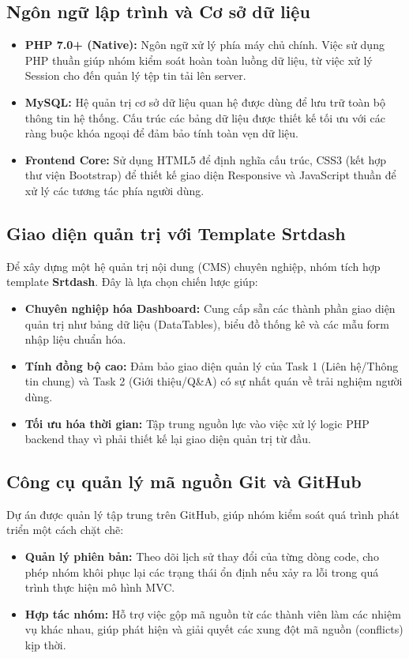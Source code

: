 \subsection{Ngôn ngữ lập trình và Cơ sở dữ liệu}
\begin{itemize}
    \item \textbf{PHP 7.0+ (Native):} Ngôn ngữ xử lý phía máy chủ chính. Việc sử dụng PHP thuần giúp nhóm kiểm soát hoàn toàn luồng dữ liệu, từ việc xử lý Session cho đến quản lý tệp tin tải lên server.
    \item \textbf{MySQL:} Hệ quản trị cơ sở dữ liệu quan hệ được dùng để lưu trữ toàn bộ thông tin hệ thống. Cấu trúc các bảng dữ liệu được thiết kế tối ưu với các ràng buộc khóa ngoại để đảm bảo tính toàn vẹn dữ liệu.
    \item \textbf{Frontend Core:} Sử dụng HTML5 để định nghĩa cấu trúc, CSS3 (kết hợp thư viện Bootstrap) để thiết kế giao diện Responsive và JavaScript thuần để xử lý các tương tác phía người dùng.
\end{itemize}

\subsection{Giao diện quản trị với Template Srtdash}
Để xây dựng một hệ quản trị nội dung (CMS) chuyên nghiệp, nhóm tích hợp template \textbf{Srtdash}. Đây là lựa chọn chiến lược giúp:
\begin{itemize}
    \item \textbf{Chuyên nghiệp hóa Dashboard:} Cung cấp sẵn các thành phần giao diện quản trị như bảng dữ liệu (DataTables), biểu đồ thống kê và các mẫu form nhập liệu chuẩn hóa.
    \item \textbf{Tính đồng bộ cao:} Đảm bảo giao diện quản lý của Task 1 (Liên hệ/Thông tin chung) và Task 2 (Giới thiệu/Q\&A) có sự nhất quán về trải nghiệm người dùng.
    \item \textbf{Tối ưu hóa thời gian:} Tập trung nguồn lực vào việc xử lý logic PHP backend thay vì phải thiết kế lại giao diện quản trị từ đầu.
\end{itemize}

\subsection{Công cụ quản lý mã nguồn Git và GitHub}
Dự án được quản lý tập trung trên GitHub, giúp nhóm kiểm soát quá trình phát triển một cách chặt chẽ:
\begin{itemize}
    \item \textbf{Quản lý phiên bản:} Theo dõi lịch sử thay đổi của từng dòng code, cho phép nhóm khôi phục lại các trạng thái ổn định nếu xảy ra lỗi trong quá trình thực hiện mô hình MVC.
    \item \textbf{Hợp tác nhóm:} Hỗ trợ việc gộp mã nguồn từ các thành viên làm các nhiệm vụ khác nhau, giúp phát hiện và giải quyết các xung đột mã nguồn (conflicts) kịp thời.
\end{itemize}

